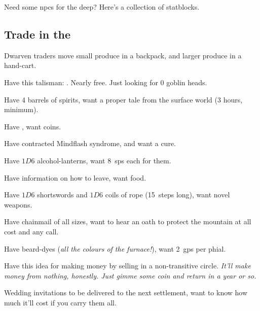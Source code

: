 \documentclass[10pt,twoside]{book}
\begin{document}
\frontmatter


\noindent
Need some \glspl{npc} for the \gls{deep}?
Here's a collection of \glspl{statblock}.

\clearpage
\pagestyle{minizine}

\subsection{Trade in the }

Dwarven traders move small produce in a backpack, and larger produce in a hand-cart.

\dwarventrader

\dwarventrader


\begin{dlistDouble}
  \item Have this \gls{talisman}: \lootTalisman.
  Nearly free.
  Just looking for 0 goblin heads.

  \showTalisman
  \item Have 4 barrels of spirits, want a proper tale from the surface world (3 hours, minimum).
  \item Have \lootJewellery, want \glspl{coin}.
  \item Have contracted Mindflash syndrome, and want a cure.
  \item Have $1D6$ alcohol-lanterns, want 8~\glspl{sp} each for them.
  \item Have information on how to leave, want food.
  \item Have $1D6$ shortswords and $1D6$ coils of rope (15~\glspl{step} long), want novel weapons.
  \item Have chainmail of all sizes, want to hear an oath to protect the mountain at all cost and any call.
  \item Have beard-dyes (\textit{all the colours of the furnace!}), want 2~\glspl{gp} per phial.
  \item Have this idea for making money by selling in a non-transitive circle.
  \textit{It'll make money from nothing, honestly.
  Just gimme some coin and return in a year or so.}
  \item Wedding invitations to be delivered to the next settlement, want to know how much it'll cost if you carry them all.
\end{dlistDouble}
\end{document}
